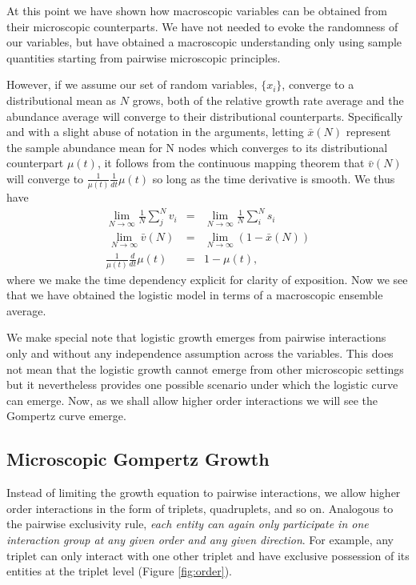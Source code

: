 \documentclass{article}
\begin{document}
At this point we have shown how macroscopic variables can be obtained from their microscopic counterparts. We have not needed to evoke the randomness of our variables, but have obtained a macroscopic understanding only using sample quantities starting from pairwise microscopic principles. 

However, if we assume our set of random variables, $\{x_i\}$, converge to a distributional mean as $N$ grows, both of the relative growth rate average and the abundance average will converge to their distributional counterparts. Specifically and with a slight abuse of notation in the arguments, letting $\bar{x}(N)$ represent the sample abundance mean for N nodes which converges to its distributional counterpart $\mu(t)$, it follows from the continuous mapping theorem that $\bar{v}(N)$ will converge to $\frac{1}{\mu(t)}\frac{1}{dt}\mu(t)$ so long as the time derivative is smooth. We thus have
\begin{eqnarray*}
  \lim_{N\rightarrow \infty} \frac{1}{N}\sum_j^N v_i &=& \lim_{N\rightarrow \infty} \frac{1}{N}\sum_i^N s_i \\\
  \lim_{N\rightarrow \infty} \bar{v}(N) &=& \lim_{N\rightarrow \infty}(1 - \bar{x}(N)) \\
   \frac{1}{\mu(t)}\frac{d}{dt}\mu(t) &=&1 - \mu(t),
\end{eqnarray*}
where we make the time dependency explicit for clarity of exposition. Now we see that we have obtained the logistic model in terms of a macroscopic ensemble average.

We make special note that logistic growth emerges from pairwise interactions only and without any independence assumption across the variables. This does not mean that the logistic growth cannot emerge from other microscopic settings but it nevertheless provides one possible scenario under which the logistic curve can emerge. Now, as we shall allow higher order interactions we will see the Gompertz curve emerge.

\subsection{Microscopic Gompertz Growth}
\label{sec:microGomp}

Instead of limiting the growth equation to pairwise interactions, we allow higher order interactions in the form of triplets, quadruplets, and so on. Analogous to the pairwise exclusivity rule, \textit{each entity can again only participate in one interaction group at any given order and any given direction}. For example, any triplet can only interact with one other triplet and have exclusive possession of its entities at the triplet level (Figure \ref{fig:order}).
\end{document}
